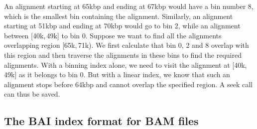 \documentclass[10pt]{article}
\begin{document}
An alignment starting at 65kbp and ending at 67kbp would have a bin
number 8, which is the smallest bin containing the alignment. Similarly,
an alignment starting at 51kbp and ending at 70kbp would go to bin 2,
while an alignment between [40k,\,49k] to bin 0. Suppose we want to find
all the alignments overlapping region [65k,\,71k). We first calculate that
bin 0, 2 and 8 overlap with this region and then traverse the alignments
in these bins to find the required alignments. With a binning index
alone, we need to visit the alignment at [40k,\,49k] as it belongs to bin
0. But with a linear index, we know that such an alignment stops before
64kbp and cannot overlap the specified region. A seek call can thus be
saved.

\subsection{The BAI index format for BAM files}
\end{document}
